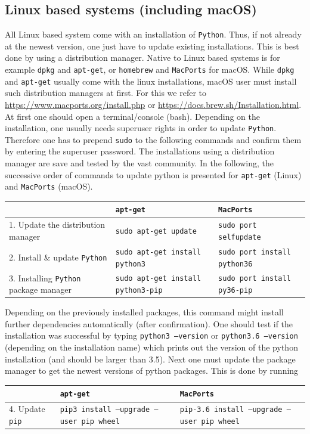 \documentclass[12pt, UK english]{iopart}
\newcommand{\python}[0]{\texttt{Python}}
\newcommand{\code}[1]{{\scriptsize\colorbox{light-gray}{\texttt{#1}}}}
\begin{document}
\subsection{Linux based systems (including macOS)}\label{appendix:python-max}
All Linux based system come with an installation of \python{}.
Thus, if not already at the newest version, one just have to update existing installations.
This is best done by using a distribution manager.
Native to Linux based systems is for example \texttt{dpkg} and \texttt{apt-get}, or \texttt{homebrew} and \texttt{MacPorts} for macOS.
While \texttt{dpkg} and \texttt{apt-get} usually come with the linux installations, macOS user must install such distribution managers at first.
For this we refer to \url{https://www.macports.org/install.php} or \url{https://docs.brew.sh/Installation.html}.
At first one should open a terminal/console (bash).
Depending on the installation, one usually needs superuser rights in order to update \python{}.
Therefore one has to prepend \code{sudo} to the following commands and confirm them by entering the superuser password.
The installations using a distribution manager are save and tested by the vast community.
In the following, the successive order of commands to update python is presented for \texttt{apt-get} (Linux) and \texttt{MacPorts} (macOS).
\begin{table}[h!]
\centering
\footnotesize
\begin{tabular}{l || l | l}
	& \texttt{apt-get} & \texttt{MacPorts} \\\hline
	1. Update the distribution manager & \code{sudo apt-get update} & \code{sudo port selfupdate} \\
	2. Install \& update \python{} & \code{sudo apt-get install python3} & \code{sudo port install python36} \\
	3. Installing \python{} package manager & \code{sudo apt-get install python3-pip} & \code{sudo port install py36-pip}
\end{tabular}
\normalsize
\end{table}

Depending on the previously installed packages, this command might install further dependencies automatically (after confirmation).
One should test if the installation was successful by typing \code{python3 --version} or \code{python3.6 --version} (depending on the installation name) which prints out the version of the python installation (and should be larger than 3.5).
Next one must update the package manager to get the newest versions of python packages.
This is done by running
\begin{table}[h!]
\centering
\footnotesize
\begin{tabular}{l || l | l}
	& \texttt{apt-get} & \texttt{MacPorts} \\\hline
	4. Update \code{pip} & \code{pip3 install --upgrade --user pip wheel} & \code{pip-3.6 install --upgrade --user pip wheel} \\
\end{tabular}
\normalsize
\end{table}
\end{document}
